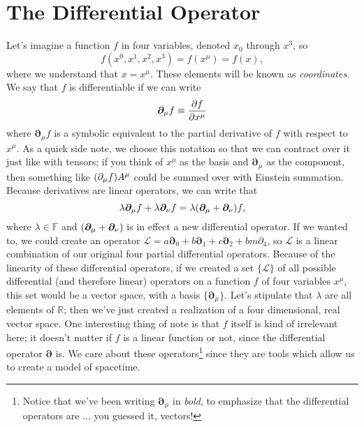 \section{The Differential Operator}
Let's imagine a function $f$ in four variables, denoted $x_0$ through $x^3$, so
\[ f(x^0,x^1,x^2,x^3) = f(x^\mu) = f(x), \]
where we understand that $x = x^\mu$.
These elements will be known as \emph{coordinates}.
We say that $f$ is differentiable if we can write
\begin{align*}
    \bm{\partial}_\mu f \equiv \pdv{f}{x^\mu}
\end{align*}
where $\bm{\partial}_\mu f$ is a symbolic equivalent to the partial derivative of $f$ with respect to $x^\mu$.
As a quick side note, we choose this notation so that we can contract over it just like with tensors; if you think of $x^\mu$ as the basis and $\bm{\partial}_\mu$ as the component, then something like $\qty(\partial_\mu f)A^\mu$ could be summed over with Einstein summation.
Because derivatives are linear operators, we can write that 
\[ \lambda\bm{\partial}_\mu f + \lambda\bm{\partial}_\nu f = \lambda\qty(\bm{\partial}_\mu + \bm{\partial}_\nu) f, \]
where $\lambda \in \mathbb{F}$ and $\qty(\bm{\partial}_\mu + \bm{\partial}_\nu)$ is in effect a new differential operator.
If we wanted to, we could create an operator $\mathcal{L} = a\bm{\partial}_0 + b\bm{\partial}_1 + c\bm{\partial}_2 + bm{\partial}_4$, so $\mathcal{L}$ is a linear combination of our original four partial differential operators.
Because of the linearity of these differential operators, if we created a set $\{\mathcal{L}\}$ of all possible differential (and therefore linear) operators on a function $f$ of four variables $x^\mu$, this set would be a vector space, with a basis $\{\bm{\partial}_\mu\}$.
Let's stipulate that $\lambda$ are all elements of $\mathbb{R}$; then we've just created a realization of a four dimensional, real vector space.
One interesting thing of note is that $f$ itself is kind of irrelevant here; it doesn't matter if $f$ is a linear function or not, since the differential operator $\bm{\partial}$ is.
We care about these operators\footnote{Notice that we've been writing $\bm{\partial}_\mu$ in \emph{bold}, to emphasize that the differential operators are ... you guessed it, vectors!} since they are tools which allow us to create a model of spacetime.

